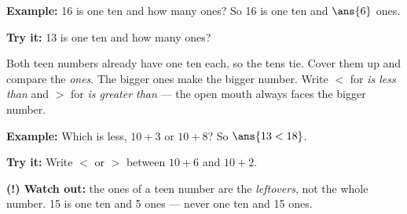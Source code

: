 \documentclass[14pt]{extarticle}
\begin{document}
\begin{examplebox}
\textbf{Example:} 16 is one ten and how many ones?
So 16 is one ten and $\ans{6}$ ones.
\end{examplebox}

\begin{tryitbox}
\textbf{Try it:} 13 is one ten and how many ones?\\[2pt]
\end{tryitbox}


\begin{formulabox}
Both teen numbers already have one ten each, so the tens tie. Cover them up and
compare the \emph{ones}. The bigger ones make the bigger number. Write $<$ for
\emph{is less than} and $>$ for \emph{is greater than} --- the open mouth
always faces the bigger number.
\end{formulabox}

\begin{examplebox}
\textbf{Example:} Which is less, $10 + 3$ or $10 + 8$?
So $\ans{13 < 18}$.
\end{examplebox}

\begin{tryitbox}
\textbf{Try it:} Write $<$ or $>$ between $10 + 6$ and $10 + 2$.\\[2pt]
\end{tryitbox}

\begin{watchoutbox}
\textbf{(!) Watch out:} the ones of a teen number are the \emph{leftovers}, not
the whole number. 15 is one ten and 5 ones --- never one ten and 15 ones.
\end{watchoutbox}
\end{document}
